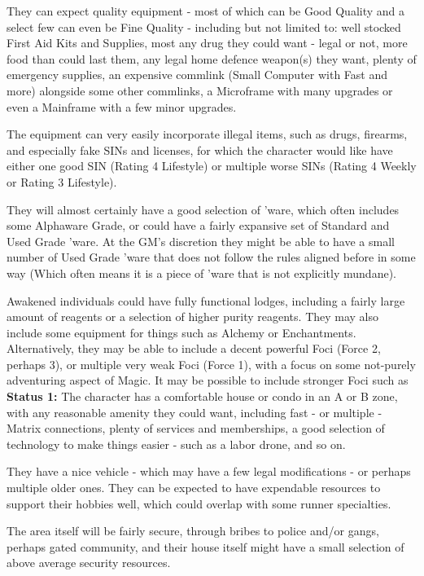 \begin{multicols}{2}
\begin{coloredbox}
	They can expect quality equipment - most of which can be Good Quality and a select few can even be Fine Quality - including but not limited to: well stocked First Aid Kits and Supplies, most any drug they could want - legal or not, more food than could last them, any legal home defence weapon(s) they want, plenty of emergency supplies, an expensive commlink (Small Computer with Fast and more) alongside some other commlinks, a Microframe with many upgrades or even a Mainframe with a few minor upgrades. 
	
	The equipment can very easily incorporate illegal items, such as drugs, firearms, and especially fake SINs and licenses, for which the character would like have either one good SIN (Rating 4 Lifestyle) or multiple worse SINs (Rating 4 Weekly or Rating 3 Lifestyle).
	
	They will almost certainly have a good selection of 'ware, which often includes some Alphaware Grade, or could have a fairly expansive set of Standard and Used Grade 'ware. At the GM's discretion they might be able to have a small number of Used Grade 'ware that does not follow the rules aligned before in some way (Which often means it is a piece of 'ware that is not explicitly mundane).
	
	Awakened individuals could have fully functional lodges, including a fairly large amount of reagents or a selection of higher purity reagents. They may also include some equipment for things such as Alchemy or Enchantments. Alternatively, they may be able to include a decent powerful Foci (Force 2, perhaps 3), or multiple very weak Foci (Force 1), with a focus on some not-purely adventuring aspect of Magic. It may be possible to include stronger Foci such as\\
	
	\textbf{Status 1:} The character has a comfortable house or condo in an A or B zone, with any reasonable amenity they could want, including fast - or multiple - Matrix connections, plenty of services and memberships, a good selection of technology to make things easier - such as a labor drone, and so on. 
	
	They have a nice vehicle - which may have a few legal modifications - or perhaps multiple older ones. They can be expected to have expendable resources to support their hobbies well, which could overlap with some runner specialties. 
	
	The area itself will be fairly secure, through bribes to police and/or gangs, perhaps gated community, and their house itself might have a small selection of above average security resources. 
	

\end{coloredbox}
\end{multicols}
